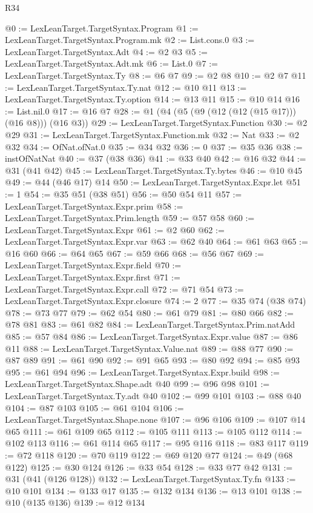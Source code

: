 \begin{lexlean}{R34}
\begin{coremodule}
@0 := LexLeanTarget.TargetSyntax.Program
@1 := LexLeanTarget.TargetSyntax.Program.mk
@2 := List.cons.{0}
@3 := LexLeanTarget.TargetSyntax.Adt
@4 := @2 @3
@5 := LexLeanTarget.TargetSyntax.Adt.mk
@6 := List.{0}
@7 := LexLeanTarget.TargetSyntax.Ty
@8 := @6 @7
@9 := @2 @8
@10 := @2 @7
@11 := LexLeanTarget.TargetSyntax.Ty.nat
@12 := @10 @11
@13 := LexLeanTarget.TargetSyntax.Ty.option
@14 := @13 @11
@15 := @10 @14
@16 := List.nil.{0}
@17 := @16 @7
@28 := @1 (@4 (@5 (@9 (@12 (@12 (@15 @17))) (@16 @8))) (@16 @3))
@29 := LexLeanTarget.TargetSyntax.Function
@30 := @2 @29
@31 := LexLeanTarget.TargetSyntax.Function.mk
@32 := Nat
@33 := @2 @32
@34 := OfNat.ofNat.{0}
@35 := @34 @32
@36 := 0
@37 := @35 @36
@38 := instOfNatNat
@40 := @37 (@38 @36)
@41 := @33 @40
@42 := @16 @32
@44 := @31 (@41 @42)
@45 := LexLeanTarget.TargetSyntax.Ty.bytes
@46 := @10 @45
@49 := @44 (@46 @17) @14
@50 := LexLeanTarget.TargetSyntax.Expr.let
@51 := 1
@54 := @35 @51 (@38 @51)
@56 := @50 @54 @11
@57 := LexLeanTarget.TargetSyntax.Expr.prim
@58 := LexLeanTarget.TargetSyntax.Prim.length
@59 := @57 @58
@60 := LexLeanTarget.TargetSyntax.Expr
@61 := @2 @60
@62 := LexLeanTarget.TargetSyntax.Expr.var
@63 := @62 @40
@64 := @61 @63
@65 := @16 @60
@66 := @64 @65
@67 := @59 @66
@68 := @56 @67
@69 := LexLeanTarget.TargetSyntax.Expr.field
@70 := LexLeanTarget.TargetSyntax.Expr.first
@71 := LexLeanTarget.TargetSyntax.Expr.call
@72 := @71 @54
@73 := LexLeanTarget.TargetSyntax.Expr.closure
@74 := 2
@77 := @35 @74 (@38 @74)
@78 := @73 @77
@79 := @62 @54
@80 := @61 @79
@81 := @80 @66
@82 := @78 @81
@83 := @61 @82
@84 := LexLeanTarget.TargetSyntax.Prim.natAdd
@85 := @57 @84
@86 := LexLeanTarget.TargetSyntax.Expr.value
@87 := @86 @11
@88 := LexLeanTarget.TargetSyntax.Value.nat
@89 := @88 @77
@90 := @87 @89
@91 := @61 @90
@92 := @91 @65
@93 := @80 @92
@94 := @85 @93
@95 := @61 @94
@96 := LexLeanTarget.TargetSyntax.Expr.build
@98 := LexLeanTarget.TargetSyntax.Shape.adt @40
@99 := @96 @98
@101 := LexLeanTarget.TargetSyntax.Ty.adt @40
@102 := @99 @101
@103 := @88 @40
@104 := @87 @103
@105 := @61 @104
@106 := LexLeanTarget.TargetSyntax.Shape.none
@107 := @96 @106
@109 := @107 @14 @65
@111 := @61 @109 @65
@112 := @105 @111
@113 := @105 @112
@114 := @102 @113
@116 := @61 @114 @65
@117 := @95 @116
@118 := @83 @117
@119 := @72 @118
@120 := @70 @119
@122 := @69 @120 @77
@124 := @49 (@68 @122)
@125 := @30 @124
@126 := @33 @54
@128 := @33 @77 @42
@131 := @31 (@41 (@126 @128))
@132 := LexLeanTarget.TargetSyntax.Ty.fn
@133 := @10 @101
@134 := @133 @17
@135 := @132 @134
@136 := @13 @101
@138 := @10 (@135 @136)
@139 := @12 @134

\end{coremodule}
\end{lexlean}
